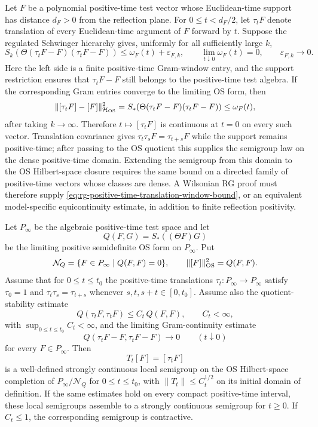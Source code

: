 Let \(F\) be a polynomial positive-time test vector whose Euclidean-time
support has distance \(d_F>0\) from the reflection plane.  For
\(0\leq t<d_F/2\), let \(\tau_tF\) denote translation of every Euclidean-time
argument of \(F\) forward by \(t\).  Suppose the regulated Schwinger
hierarchy gives, uniformly for all sufficiently large \(k\),
\begin{equation}
  S_k\!\left(
    \Theta(\tau_tF-F)(\tau_tF-F)
  \right)
  \leq \omega_F(t)+\varepsilon_{F,k},
  \qquad
  \lim_{t\downarrow0}\omega_F(t)=0,\qquad
  \varepsilon_{F,k}\to0 .
  \label{eq:rg-positive-time-translation-window-bound}
\end{equation}
Here the left side is a finite positive-time Gram-window entry, and the
support restriction ensures that \(\tau_tF-F\) still belongs to the
positive-time test algebra.  If the corresponding Gram entries converge to
the limiting OS form, then
\[
  \|[\tau_tF]-[F]\|_{\mathcal H_{\rm OS}}^2
  =
  S_\ast\!\left(
    \Theta(\tau_tF-F)(\tau_tF-F)
  \right)
  \leq \omega_F(t),
\]
after taking \(k\to\infty\).  Therefore \(t\mapsto[\tau_tF]\) is continuous at
\(t=0\) on every such vector.  Translation covariance gives
\(\tau_t\tau_sF=\tau_{t+s}F\) while the support remains positive-time; after
passing to the OS quotient this supplies the semigroup law on the dense
positive-time domain.  Extending the semigroup from this domain to the OS
Hilbert-space closure requires the same bound on a directed family of
positive-time vectors whose classes are dense.  A Wilsonian RG proof must
therefore supply \eqref{eq:rg-positive-time-translation-window-bound}, or an
equivalent model-specific equicontinuity estimate, in addition to finite
reflection positivity.

\begin{lemma}
\label{lem:rg-positive-time-quotient-semigroup-criterion}
Let \(P_\infty\) be the algebraic positive-time test space and let
\[
  Q(F,G)=S_\ast((\Theta F)G)
\]
be the limiting positive semidefinite OS form on \(P_\infty\).  Put
\[
  \mathcal N_Q=\{F\in P_\infty\mid Q(F,F)=0\},
  \qquad
  \|[F]\|_{\rm OS}^2=Q(F,F).
\]
Assume that for \(0\le t\le t_0\) the positive-time translations
\(\tau_t:P_\infty\to P_\infty\) satisfy \(\tau_0=1\) and
\(\tau_t\tau_s=\tau_{t+s}\) whenever \(s,t,s+t\in[0,t_0]\).  Assume also the
quotient-stability estimate
\begin{equation}
  Q(\tau_tF,\tau_tF)\le C_t\,Q(F,F),
  \qquad C_t<\infty ,
  \label{eq:rg-os-quotient-null-stability-bound}
\end{equation}
with \(\sup_{0\le t\le t_0}C_t<\infty\), and the limiting Gram-continuity
estimate
\[
  Q(\tau_tF-F,\tau_tF-F)\longrightarrow0
  \qquad (t\downarrow0)
\]
for every \(F\in P_\infty\).  Then
\[
  T_t[F]=[\tau_tF]
\]
is a well-defined strongly continuous local semigroup on the OS Hilbert-space
completion of \(P_\infty/\mathcal N_Q\) for \(0\le t\le t_0\), with
\(\|T_t\|\le C_t^{1/2}\) on its initial domain of definition.  If the same
estimates hold on every compact positive-time interval, these local semigroups
assemble to a strongly continuous semigroup for \(t\ge0\).  If \(C_t\le1\),
the corresponding semigroup is contractive.
\end{lemma}

